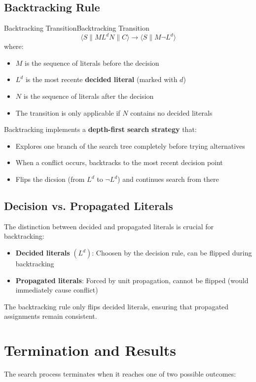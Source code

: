 \documentclass[a4paper]{article}
\theoremstyle{definition}
\begin{document}
\subsection{Backtracking Rule}
\begin{definition}{Backtracking Transition}{Backtracking Transition}
\[
  \langle S \parallel M L^d N \parallel C \rangle \rightarrow \langle S \parallel M \lnot L^d \rangle 
\]
where:
\begin{itemize}
    \item \( M \) is the sequence of literals before the decision 
    \item \( L^d \) is the most recente \textbf{decided literal} (marked with $d$)
    \item \( N \) is the sequence of literals after the decision 
    \item The transition is only applicable if \( N \) contains no decided literals 
\end{itemize}
\end{definition}
Backtracking implements a \textbf{depth-first search strategy} that:
\begin{itemize}
    \item Explores one branch of the search tree completely before trying alternatives 
    \item When a conflict occurs, backtracks to the most recent decision point 
    \item Flips the dicsion (from $L^d$ to $\lnot L^d$) and continues search from there
\end{itemize}
\subsection{Decision vs. Propagated Literals}
The distinction between decided and propagated literals is crucial for backtracking:
\begin{itemize}
    \item \textbf{Decided literals} \( (L^d) \): Choosen by the decision rule, can be flipped during backtracking 
    \item \textbf{Propagated literals}: Forced by unit propagation, cannot be flipped (would immediately cause conflict)
\end{itemize}
The backtracking rule only flips decided literals, ensuring that propagated assignments remain consistent.
\section{Termination and Results}
The search process terminates when it reaches one of two possible outcomes:
\end{document}
